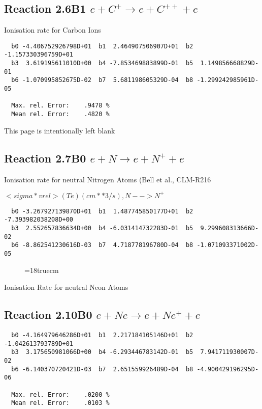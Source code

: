 \subsection{
Reaction 2.6B1   $e + C^+ \rightarrow e + C^{++} + e  $
}

  Ionisation rate for Carbon Ions


\begin{verbatim}
  b0 -4.406752926798D+01  b1  2.464907506907D+01  b2 -1.157330396759D+01
  b3  3.619195611010D+00  b4 -7.853469883899D-01  b5  1.149856668829D-01
  b6 -1.070995852675D-02  b7  5.681198605329D-04  b8 -1.299242985961D-05

  Max. rel. Error:    .9478 %
  Mean rel. Error:    .4820 %

\end{verbatim}
\newpage
This page is intentionally left blank
\newpage



\subsection{
Reaction 2.7B0   $e + N \rightarrow e + N^+ + e  $
}

  Ionisation rate for neutral Nitrogen Atoms
  (Bell et al., CLM-R216

  $<sigma*vrel>(Te)  (cm**3/s), N --> N^+$

\begin{verbatim}
  b0 -3.267927139870D+01  b1  1.487745850177D+01  b2 -7.393982038208D+00
  b3  2.552657836634D+00  b4 -6.031414732283D-01  b5  9.299608313666D-02
  b6 -8.862541230616D-03  b7  4.718778196780D-04  b8 -1.071093371002D-05

\end{verbatim}
\begin{figure} \label{2.7B0}
\epsfxsize=18truecm
\end{figure}
\newpage


 Ionisation Rate for neutral Neon Atoms

\subsection{
Reaction 2.10B0   $e + Ne \rightarrow e + Ne^+ + e  $
}

\begin{verbatim}
  b0 -4.164979646286D+01  b1  2.217184105146D+01  b2 -1.042613793789D+01
  b3  3.175650981066D+00  b4 -6.293446783142D-01  b5  7.941711930007D-02
  b6 -6.140370720421D-03  b7  2.651559926489D-04  b8 -4.900429196295D-06

  Max. rel. Error:    .0200 %
  Mean rel. Error:    .0103 %

\end{verbatim}

